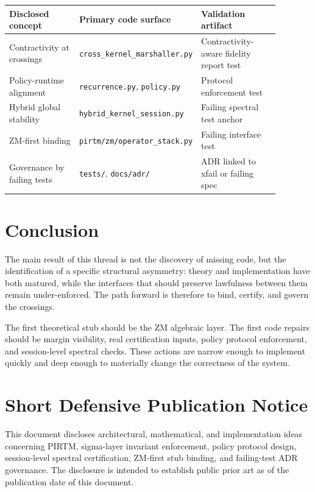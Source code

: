 \documentclass[11pt]{article}
\begin{document}
\begin{longtable}{p{0.28\linewidth} p{0.28\linewidth} p{0.32\linewidth}}
\toprule
\textbf{Disclosed concept} & \textbf{Primary code surface} & \textbf{Validation artifact} \\
\midrule
Contractivity at crossings & \texttt{cross\_kernel\_marshaller.py} & Contractivity-aware fidelity report test \\
Policy-runtime alignment & \texttt{recurrence.py}, \texttt{policy.py} & Protocol enforcement test \\
Hybrid global stability & \texttt{hybrid\_kernel\_session.py} & Failing spectral test anchor \\
ZM-first binding & \texttt{pirtm/zm/operator\_stack.py} & Failing interface test \\
Governance by failing tests & \texttt{tests/}, \texttt{docs/adr/} & ADR linked to xfail or failing spec \\
\bottomrule
\end{longtable}

\section{Conclusion}

The main result of this thread is not the discovery of missing code, but the identification of a specific structural asymmetry: theory and implementation have both matured, while the interfaces that should preserve lawfulness between them remain under-enforced. The path forward is therefore to bind, certify, and govern the crossings.

The first theoretical stub should be the ZM algebraic layer. The first code repairs should be margin visibility, real certification inputs, policy protocol enforcement, and session-level spectral checks. These actions are narrow enough to implement quickly and deep enough to materially change the correctness of the system.

\appendix

\section{Short Defensive Publication Notice}

This document discloses architectural, mathematical, and implementation ideas concerning PIRTM, sigma-layer invariant enforcement, policy protocol design, session-level spectral certification, ZM-first stub binding, and failing-test ADR governance. The disclosure is intended to establish public prior art as of the publication date of this document.
\end{document}
